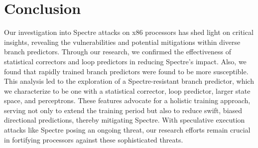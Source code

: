 \documentclass[twocolumn,showpacs,%
  nofootinbib,aps,superscriptaddress,%
  eqsecnum,prd,notitlepage,showkeys,10pt]{revtex4-1}
\begin{document}
\section{Conclusion}
Our investigation into Spectre attacks on x86 processors has shed light on critical insights, revealing the vulnerabilities and potential mitigations within diverse branch predictors. Through our research, we confirmed the effectiveness of statistical correctors and loop predictors in reducing Spectre's impact. Also, we found that rapidly trained branch predictors were found to be more susceptible. This analysis led to the exploration of a Spectre-resistant branch predictor, which we characterize to be one with a statistical corrector, loop predictor, larger state space, and perceptrons. These features advocate for a holistic training approach, serving not only to extend the training period but also to reduce swift, biased directional predictions, thereby mitigating Spectre. With speculative execution attacks like Spectre posing an ongoing threat, our research efforts remain crucial in fortifying processors against these sophisticated threats.











\printbibliography
\end{document}
